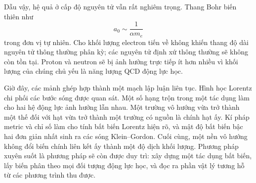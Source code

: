 \begin{classroomqa}
\end{classroomqa}

\begin{classroomqa}
\end{classroomqa}

\begin{classroomqa}
\end{classroomqa}

Dẫu vậy, hệ quả ở cấp độ nguyên tử vẫn rất nghiêm trọng. Thang Bohr biến thiên như
\begin{equation}
a_0\sim\frac{1}{\alpha m_e}
\end{equation}
trong đơn vị tự nhiên. Cho khối lượng electron tiến về không khiến thang độ dài nguyên tử thông thường phân kỳ; các nguyên tử định xứ thông thường sẽ không còn tồn tại. Proton và neutron sẽ bị ảnh hưởng trực tiếp ít hơn nhiều vì khối lượng của chúng chủ yếu là năng lượng QCD động lực học.

Giờ đây, các mảnh ghép hợp thành một mạch lập luận liên tục. Hình học Lorentz chi phối các bước sóng được quan sát. Một số hạng trộn trong một tác dụng làm cho hai hệ động lực ảnh hưởng lẫn nhau. Một trường vô hướng vừa trở thành một thế đối với hạt vừa trở thành một trường có nguồn là chính hạt ấy. Kí pháp metric và chỉ số làm cho tính bất biến Lorentz hiện rõ, và mật độ bất biến bậc hai đơn giản nhất sinh ra các sóng Klein--Gordon. Cuối cùng, một nền vô hướng không đổi biến chính liên kết ấy thành một độ dịch khối lượng. Phương pháp xuyên suốt là phương pháp sẽ còn được duy trì: xây dựng một tác dụng bất biến, lấy biến phân theo mọi đối tượng động lực học, và đọc ra phần vật lý tương hỗ từ các phương trình thu được.